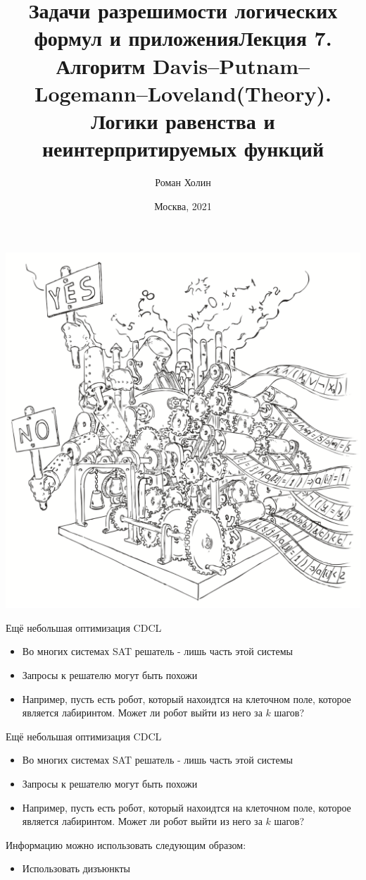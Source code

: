 \documentclass{beamer}
\begin{document}
\title{Задачи разрешимости логических формул и приложения\newline Лекция 7. Алгоритм Davis–Putnam–Logemann–Loveland(Theory).
Логики равенства и неинтерпритируемых функций}
\author{Роман Холин}
\date{Москва, 2021}

\begin{frame}
\includegraphics[scale=0.5]{../decision-procedure.png}
\end{frame}

\frame{\titlepage}

\begin{frame}{Ещё небольшая оптимизация CDCL}
\begin{itemize}
\item Во многих системах SAT решатель - лишь часть этой системы
\item Запросы к решателю могут быть похожи
\item Например, пусть есть робот, который нахоидтся на клеточном поле, которое является лабиринтом. Может ли робот выйти из него
за $k$ шагов?
\end{itemize}
\end{frame}

\begin{frame}{Ещё небольшая оптимизация CDCL}
\begin{itemize}
\item Во многих системах SAT решатель - лишь часть этой системы
\item Запросы к решателю могут быть похожи
\item Например, пусть есть робот, который нахоидтся на клеточном поле, которое является лабиринтом. Может ли робот выйти из него
за $k$ шагов?
\end{itemize}
Информацию можно использовать следующим образом:
\begin{itemize}
\item Использовать дизъюнкты
\end{itemize}
\end{frame}
\end{document}
